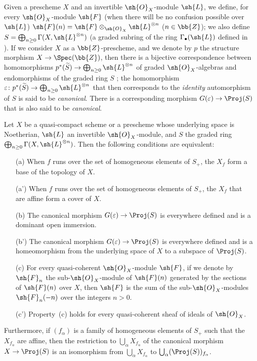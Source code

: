 \begin{env}[4.5.1]
\label{II.4.5.1}
Given a prescheme $X$ and an invertible $\sh{O}_X$-module $\sh{L}$, we define, for every $\sh{O}_X$-module $\sh{F}$ (when there will be no confusion possible over $\sh{L}$) $\sh{F}(n)=\sh{F}\otimes_{\sh{O}_X}\sh{L}^{\otimes n}$ ($n\in\bb{Z}$);
we also define $S=\bigoplus_{n\geq0}\Gamma(X,\sh{L}^{\otimes n})$ (a graded subring of the ring $\Gamma_\bullet(\sh{L})$ defined in ).
If we consider $X$ as a $\bb{Z}$-prescheme, and we denote by $p$ the structure morphism $X\to\Spec(\bb{Z})$, then there is a bijective correspondence between homomorphisms $p^*(\widetilde{S})\to\bigoplus_{n\geq0}\sh{L}^{\otimes n}$ of graded $\sh{O}_X$-algebras and endomorphisms of the graded ring $S$ ;
the homomorphism $\varepsilon\colon p^*(\widetilde{S})\to\bigoplus_{n\geq0}\sh{L}^{\otimes n}$ that then corresponds to the \emph{identity} automorphism of $S$ is said to be \emph{canonical}.
There is a corresponding  morphism $G(\varepsilon)\to\Proj(S)$ that is also said to be \emph{canonical}.
\end{env}

\begin{theorem}[4.5.2]
\label{II.4.5.2}
Let $X$ be a quasi-compact scheme or a prescheme whose underlying space is Noetherian, $\sh{L}$ an invertible $\sh{O}_X$-module, and $S$ the graded ring $\bigoplus_{n\geq0}\Gamma(X,\sh{L}^{\otimes n})$.
Then the following conditions are equivalent:
\begin{enumerate}
  \item[\rm{(a)}] When $f$ runs over the set of homogeneous elements of $S_+$, the $X_f$ form a base of the topology of $X$.
  \item[\rm{(a')}] When $f$ runs over the set of homogeneous elements of $S_+$, the $X_f$ that are affine form a cover of $X$.
  \item[\rm{(b)}] The canonical morphism $G(\varepsilon)\to\Proj(S)$  is everywhere defined and is a dominant open immersion.
  \item[\rm{(b')}] The canonical morphism $G(\varepsilon)\to\Proj(S)$ is everywhere defined and is a homeomorphism from the underlying space of $X$ to a subspace of $\Proj(S)$.
  \item[\rm{(c)}] For every quasi-coherent $\sh{O}_X$-module $\sh{F}$, if we denote by $\sh{F}_n$ the sub-$\sh{O}_X$-module of $\sh{F}(n)$ generated by the sections of $\sh{F}(n)$ over $X$, then $\sh{F}$ is the sum of the sub-$\sh{O}_X$-modules $\sh{F}_n(-n)$ over the integers $n>0$.
  \item[\rm{(c')}] Property~\rm{(c)} holds for every quasi-coherent sheaf of ideals of $\sh{O}_X$.
\end{enumerate}

Furthermore, if $(f_\alpha)$ is a family of homogeneous elements of $S_+$ such that the $X_{f_\alpha}$ are affine, then the restriction to $\bigcup_\alpha X_{f_\alpha}$ of the canonical morphism $X\to\Proj(S)$ is an isomorphism from $\bigcup_\alpha X_{f_\alpha}$ to $\bigcup_\alpha(\Proj(S))_{f_\alpha}$.
\end{theorem}

